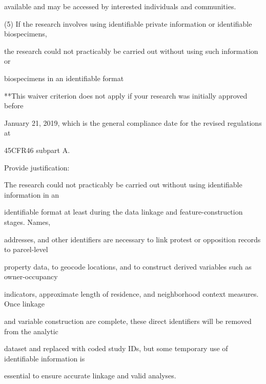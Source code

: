 \documentclass[10pt, letterpaper]{article}
\begin{document}
\begin{responsebox}
available and may be accessed by interested individuals and communities.

\vspace{0.5em}

\vspace{0.5em}

(5) If the research involves using identifiable private information or identifiable biospecimens,

the research could not practicably be carried out without using such information or

biospecimens in an identifiable format

\vspace{0.5em}

\vspace{0.5em}

**This waiver criterion does not apply if your research was initially approved before

January 21, 2019, which is the general compliance date for the revised regulations at

45CFR46 subpart A.

\vspace{0.5em}

\vspace{0.5em}

Provide justification:

The research could not practicably be carried out without using identifiable information in an

identifiable format at least during the data linkage and feature-construction stages. Names,

addresses, and other identifiers are necessary to link protest or opposition records to parcel-level

property data, to geocode locations, and to construct derived variables such as owner-occupancy

indicators, approximate length of residence, and neighborhood context measures. Once linkage

and variable construction are complete, these direct identifiers will be removed from the analytic

dataset and replaced with coded study IDs, but some temporary use of identifiable information is

essential to ensure accurate linkage and valid analyses.

\vspace{0.5em}

\vspace{0.5em}

\end{responsebox}
\end{document}
